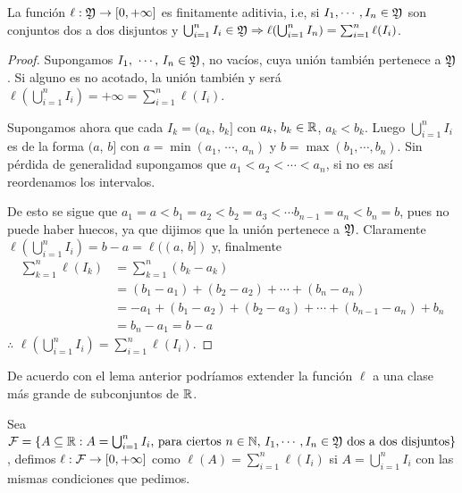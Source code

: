 \begin{lemma}
    La función \(\ell : \mathfrak{Y} \to [0, +\infty]\) es finitamente aditivia, i.e, si \(I_1, \cdots, I_n \in \mathfrak{Y}\) son conjuntos dos a dos disjuntos y
    \(\bigcup_{i = 1}^n I_i \in \mathfrak{Y} \Rightarrow \ell(\bigcup_{i = 1}^n I_n) = \sum_{i = 1}^n \ell(I_i)\).
    \begin{proof}
        Supongamos \(I_1\text{, } \cdots \text{, } I_n \in \mathfrak{Y}\), no vacíos, cuya unión también pertenece a \(\mathfrak{Y}\).
        Si alguno es no acotado, la unión también y será \(\ell(\bigcup_{i = 1}^n I_i) = +\infty = \sum_{i = 1}^n \ell(I_i)\).

        Supongamos ahora que cada \(I_k = (a_k\text{, } b_k]\) con \(a_k\text{, } b_k \in \mathbb{R}\), \(a_k < b_k\).
        Luego \(\bigcup_{i = 1}^n I_i\) es de la forma \((a \text{, } b]\) con \(a = \min(a_1\text{, } \cdots \text{, } a_n)\) y \(b = \max(b_1, \cdots, b_n)\).
        Sin pérdida de generalidad supongamos que \(a_1 < a_2 < \cdots < a_n\), si no es así reordenamos los intervalos.

        De esto se sigue que \(a_1 = a < b_1 = a_2 < b_2 = a_3 < \cdots b_{n - 1} = a_n < b_n = b\), pues no puede haber huecos, ya que dijimos que la unión pertenece a \(\mathfrak{Y}\).
        Claramente \(\ell(\bigcup_{i = 1}^n I_i) = b - a = \ell((a\text{, } b])\) y, finalmente \begin{align*}
            \sum_{k = 1}^n \ell(I_k) & = \sum_{k = 1}^n (b_k - a_k)                                          \\
                                     & = (b_1 - a_1) + (b_2 - a_2) + \cdots + (b_n - a_n)                    \\
                                     & = -a_1 + (b_1 - a_2) + (b_2 - a_3) + \cdots + (b_{n - 1} - a_n) + b_n \\
                                     & = b_n - a_1 = b - a
        \end{align*}
        \(\therefore\) \(\ell(\bigcup_{i = 1}^n I_i) = \sum_{i = 1}^n \ell(I_i)\).
    \end{proof}
\end{lemma}

De acuerdo con el lema anterior podríamos extender la función \(\ell\) a una clase más grande de subconjuntos de \(\mathbb{R}\).

Sea \(\mathcal{F} = \{ A \subseteq \mathbb{R} : A = \bigcup_{i = 1}^n I_i \text{, para ciertos } n \in \mathbb{N} \text{, } I_1, \cdots, I_n \in \mathfrak{Y} \text{ dos a dos disjuntos} \}\),
defimos \(\ell : \mathcal{F} \to [0, +\infty]\) como \(\ell(A) = \sum_{i = 1}^n \ell(I_i)\) si \(A = \bigcup_{i = 1}^n I_i\) con las mismas condiciones que pedimos.

